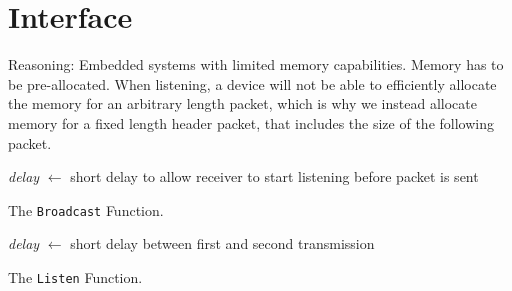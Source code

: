 \section{Interface}\label{sec:interface}

Reasoning: Embedded systems with limited memory capabilities. Memory has to be pre-allocated. When listening,
a device will not be able to efficiently allocate the memory for an arbitrary length packet, which is why we
instead allocate memory for a fixed length header packet, that includes the size of the following packet.


\begin{algorithm}[ht]
    \DontPrintSemicolon
    \textit{delay} $\leftarrow$ short delay to allow receiver to start listening before packet is sent\;


    \caption{The \texttt{Broadcast} Function.}
    \label{algo:2phase-broadcast}
\end{algorithm}


\begin{algorithm}[ht]
    \DontPrintSemicolon
    \textit{delay} $\leftarrow$ short delay between first and second transmission\;
    
    
    \caption{The \texttt{Listen} Function.}
    \label{algo:2phase-receive}
\end{algorithm}